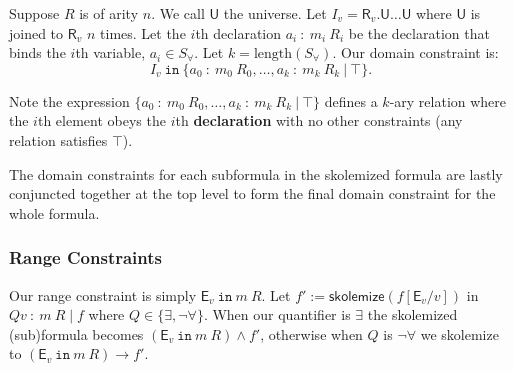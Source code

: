 \documentclass{article}
\theoremstyle{definition}
\begin{document}
    Suppose $R$ is of arity $n$. We call $\textsf{U}$ the universe. Let $I_v = \textsf{R}_v.\textsf{U} \dots \textsf{U}$ where $\textsf{U}$ is joined to $\textsf{R}_v$ $n$ times. Let the $i$th declaration $a_i~:~m_i~R_i$ be the declaration that binds the $i$th variable, $a_i \in S_\forall$. Let $k = \text{length}(S_\forall)$. Our domain constraint is:
    $$I_v ~ \texttt{in} ~ \{a_0~:~m_0~R_0, \dots, a_k~:~m_k~R_k~\vert~\top\}.$$

    Note the expression $\{a_0~:~m_0~R_0, \dots, a_k~:~m_k~R_k~\vert~\top\}$ defines a $k$-ary relation where the $i$th element obeys the $i$th \textbf{declaration} with no other constraints (any relation satisfies $\top$).

    The domain constraints for each subformula in the skolemized formula are lastly conjuncted together at the top level to form the final domain constraint for the whole formula.



    \subsubsection*{Range Constraints}
    Our range constraint is simply $\textsf{E}_v ~\texttt{in}~ m~R$. Let $f' := \textsf{skolemize}(f[\textsf{E}_v / v])$ in $Qv~:~m~R \mid f$ where $Q \in \{\exists, \neg \forall\}$. When our quantifier is $\exists$ the skolemized (sub)formula becomes $(\textsf{E}_v~\texttt{in}~ m~ R) \land f'$, otherwise when $Q$ is $\neg \forall$ we skolemize to $(\textsf{E}_v ~\texttt{in}~ m~R) \to f'$.
\end{document}
